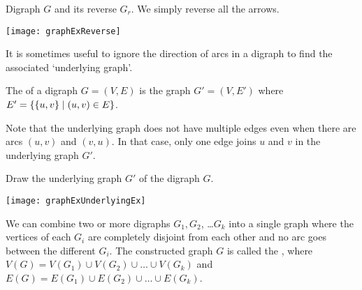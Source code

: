 \begin{Boxample}\label{exr:compute-reverse}
Digraph $G$ and its reverse $G_r$. We simply reverse all the arrows.
\begin{center}
\texttt{[image: graphExReverse]}
\end{center}
\end{Boxample}

It is sometimes useful to ignore the direction of arcs in a digraph to find the associated `underlying graph'.

\begin{Definition} 
The  of a digraph $G = (V, E)$ is the graph 
$G' = (V, E')$ where $E' = \mbox{$\{\{u, v\} \mid (u, v)\in E\}$}$.
\end{Definition}

Note that the underlying graph does not have multiple edges even when there are arcs $(u, v)$ and $(v, u)$. 
In that case, only one edge joins $u$ and $v$ in the underlying graph $G'$.  

\begin{Boxample}
Draw the underlying graph $G'$ of the digraph $G$.
\begin{center}
\texttt{[image: graphExUnderlyingEx]}
\end{center}
\end{Boxample}

\begin{Definition} 
We can combine two or more digraphs $G_1, G_2$, \ldots $G_k$ into a
single graph where the vertices of each $G_i$ are completely disjoint from
each other and no arc goes between the different $G_i$. The constructed
graph $G$ is called the , where $V(G) = V(G_1) \cup
V(G_2) \cup \ldots \cup V(G_k)$ and $E(G) = E(G_1) \cup E(G_2) \cup \ldots
\cup E(G_k)$.
\end{Definition}



